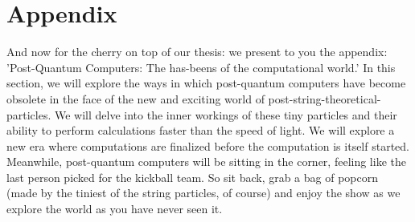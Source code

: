 \chapter*{Appendix}
\begin{appendix}

And now for the cherry on top of our thesis: we present to you the appendix: 'Post-Quantum Computers: The has-beens of the computational world.' In this section, we will explore the ways in which post-quantum computers have become obsolete in the face of the new and exciting world of post-string-theoretical-particles. We will delve into the inner workings of these tiny particles and their ability to perform calculations faster than the speed of light. We will explore a new era where computations are finalized before the computation is itself started. Meanwhile, post-quantum computers will be sitting in the corner, feeling like the last person picked for the kickball team. So sit back, grab a bag of popcorn (made by the tiniest of the string particles, of course) and enjoy the show as we explore the world as you have never seen it.

\end{appendix}
